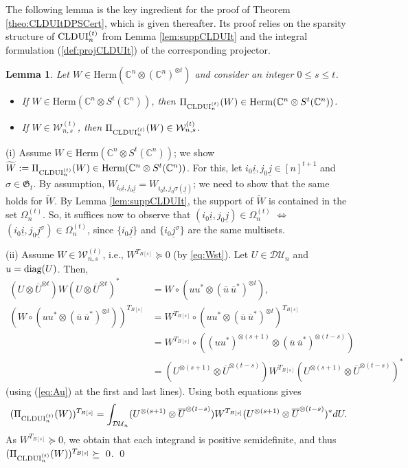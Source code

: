 \documentclass[11pt]{article}
\makeatletter
\newcommand{\C}{\ensuremath{\mathbb{C}}} %
\newcommand{\Perm}{\mathfrak G}
\newcommand{\MV}{{\mathcal V}}
\newcommand{\MW}{{\mathcal W}}
\newcommand{\MDU}{{\mathcal {DU}}}
\newcommand{\Herm}{\mathrm{Herm}}
\newcommand{\CLDUI}{\text{\rm CLDUI}}
\newcommand{\ou}{\overline u}
\newcommand{\diag}{\text{\rm diag}}
\newcommand{\ot}{\otimes}
\newcommand{\ui}{\underline{i}}
\newcommand{\uj}{\underline{j}}
\theoremstyle{plain}
\newtheorem{lemma}[satz]{Lemma}
\renewenvironment{proof}[1][\proofname]{%
  \par
  \pushQED{}%
  \normalfont
  \topsep6\p@\@plus6\p@
  \trivlist
  \item[\hskip\labelsep\itshape #1\@addpunct{.}]%
}{%
  \popQED
  \endtrivlist
}
\makeatother
\begin{document}
The following lemma is the key ingredient for the proof of Theorem \ref{theo:CLDUItDPSCert}, which is given thereafter. Its proof relies on the sparsity structure of $\CLDUI^{(t)}_n$ from Lemma \ref{lem:suppCLDUIt} and the  integral formulation (\ref{def:projCLDUIt}) of the corresponding projector.

\begin{lemma}\label{lem:WsPiCLDUIt}
Let $W\in \Herm(\C^n\ot(\C^n)^{\ot t})$ and consider an integer $0\le s\le t$.
  \begin{itemize}
  \item[(i)]  If $W\in\Herm(\C^n\ot S^t(\C^n))$, then $\Pi_{\CLDUI^{(t)}_n}(W)\in \Herm(\C^n\ot S^t(\C^n))$. 
  \item[(ii)] If  $W\in \MW^{(t)}_{n,s}$, then $\Pi_{\CLDUI^{(t)}_n}(W)\in\MW^{(t)}_{n,s}$.	
  \end{itemize}
\end{lemma}
	
\begin{proof}
 (i) Assume $W\in\Herm(\C^n\ot S^t(\C^n))$; we show  $\widetilde W:=\Pi_{\CLDUI^{(t)}_n}(W)\in \Herm(\C^n\ot S^t(\C^n))$.
 For this, let $i_0\ui,j_0\uj\in [n]^{t+1}$ and $\sigma\in \Perm_t$. 
 By assumption, $W_{i_0\ui,j_0\uj}=W_{i_0\ui,j_0\sigma(\uj)}$; we need to show that the same holds for $\widetilde W$. By Lemma \ref{lem:suppCLDUIt}, the support of $\widetilde W$ is contained in the set $\Omega^{(t)}_n$. So, it suffices now to observe that $(i_0\ui,j_0\uj)\in\Omega^{(t)}_n$ $\Longleftrightarrow$ $(i_0\ui,j_0\uj^\sigma)\in \Omega^{(t)}_n$, since  $\{i_0\uj\}$ and $\{i_0\uj^\sigma\}$ are the same multisets.
   
 (ii)   Assume $W\in \MW^{(t)}_{n,s}$, i.e., $W^{T_{B[s]}}\succeq 0$ (by   \eqref{eq:Wst}). Let $U\in\MDU_n$ and $u=\diag(U)$. Then, 
    \begin{align*}
		(U\ot \overline U^{\ot t}) W (U\ot   \overline U^{\ot t})^* & =
		W\circ (uu^* \ot (\ou \  \ou^*)^{\ot t}),\\
 (W\circ (uu^* \ot (\ou \  \ou^*)^{\ot t}))^{T_{B[s]}} &  =W^{T_{B[s]}} \circ (uu^* \ot (\ou \  \ou^*)^{\ot t})^{T_{B[s]}}  \\
 & =W^{T_{B[s]}} \circ ( (u u^*)^{\ot (s+1)} \ot (\ou \ \ou^*)^{\ot(t-s)})\\
& = (U^{\ot (s+1)}\ot\overline{U}^{\ot (t-s)})W^{T_{B[s]}}(U^{\ot (s+1)}\ot\overline{U}^{\ot (t-s)})^*
 \end{align*}
(using (\ref{eq:Au}) at the first and last lines).    Using both equations gives $$(\Pi_{\CLDUI^{(t)}_n}(W))^{T_{B[s]}}
    =\int_{\MDU_n}(U^{\ot (s+1)}\ot\overline{U}^{\ot (t-s)})W^{T_{B[s]}}(U^{\ot (s+1)}\ot\overline{U}^{\ot (t-s)})^*dU.$$
As $W^{T_{B[s]}}\succeq 0$, we obtain that each integrand is positive semidefinite, and thus $(\Pi_{\CLDUI^{(t)}_n}(W))^{T_{B[s]}}\succeq~0$.
\qed
\end{proof}
\end{document}
